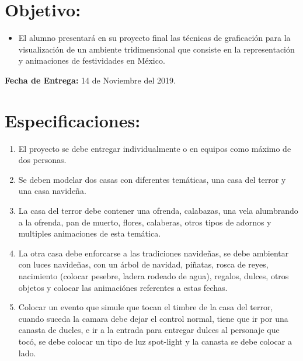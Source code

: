 \documentclass[12pt,letterpaper]{article}
\begin{document}
\section*{Objetivo:}
\begin{itemize}
\item El alumno presentar\'a en su proyecto final las t\'ecnicas de graficación para la visualizaci\'on de un ambiente tridimensional que consiste en la representaci\'on y animaciones de festividades en M\'exico. 
\end{itemize}

\textbf{Fecha de Entrega:} 14 de Noviembre del 2019.


\section*{Especificaciones:}

\begin{enumerate}
\item El proyecto se debe entregar individualmente o en equipos como m\'aximo de dos personas.
\item Se deben modelar dos casas con diferentes tem\'aticas, una casa del terror y una casa navideña.
\item La casa del terror debe contener una ofrenda, calabazas, una vela alumbrando a la ofrenda, pan de muerto, flores, calaberas, otros tipos de adornos y multiples animaciones de esta tem\'atica.
\item La otra casa debe enforcarse a las tradiciones navideñas, se debe ambientar con luces navideñas, con un \'arbol de navidad, piñatas, rosca de reyes, nacimiento (colocar pesebre, ladera rodeado de agua), regalos, dulces, otros objetos y colocar las animaci\'ones referentes a estas fechas.
\item Colocar un evento que simule que tocan el timbre de la casa del terror, cuando suceda la camara debe dejar el control normal, tiene que ir por una canasta de ducles, e ir a la entrada para entregar dulces al personaje que tocó, se debe colocar un tipo de luz spot-light y la canasta se debe colocar a lado.
\end{enumerate}
\end{document}
